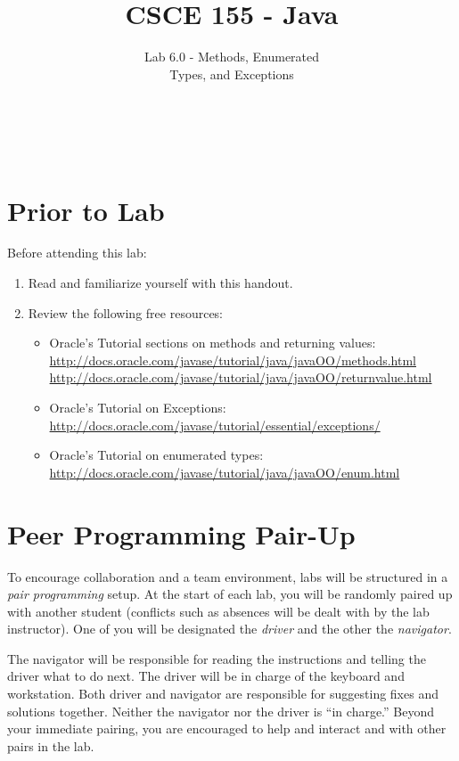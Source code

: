 \documentclass[12pt]{scrartcl}
\title{CSCE 155 - Java}
\subtitle{Lab 6.0 - Methods, Enumerated\\ Types, and Exceptions}
\author{~}
\date{~}
\begin{document}
\maketitle

\section*{Prior to Lab}

Before attending this lab:
\begin{enumerate}
  \item Read and familiarize yourself with this handout.
  \item Review the following free resources:
	\begin{itemize}
	  \item Oracle's Tutorial sections on methods and returning values:\\
		\url{http://docs.oracle.com/javase/tutorial/java/javaOO/methods.html}\\
		\url{http://docs.oracle.com/javase/tutorial/java/javaOO/returnvalue.html}
	  \item Oracle's Tutorial on Exceptions:\\
		\url{http://docs.oracle.com/javase/tutorial/essential/exceptions/}
	  \item Oracle's Tutorial on enumerated types:\\
		\url{http://docs.oracle.com/javase/tutorial/java/javaOO/enum.html}
	\end{itemize}
\end{enumerate}

\section*{Peer Programming Pair-Up}

To encourage collaboration and a team environment, labs will be
structured in a \emph{pair programming} setup.  At the start of
each lab, you will be randomly paired up with another student 
(conflicts such as absences will be dealt with by the lab instructor).
One of you will be designated the \emph{driver} and the other
the \emph{navigator}.  

The navigator will be responsible for reading the instructions and
telling the driver what to do next.  The driver will be in charge of the
keyboard and workstation.  Both driver and navigator are responsible
for suggesting fixes and solutions together.  Neither the navigator
nor the driver is ``in charge.''  Beyond your immediate pairing, you
are encouraged to help and interact and with other pairs in the lab.
\end{document}
